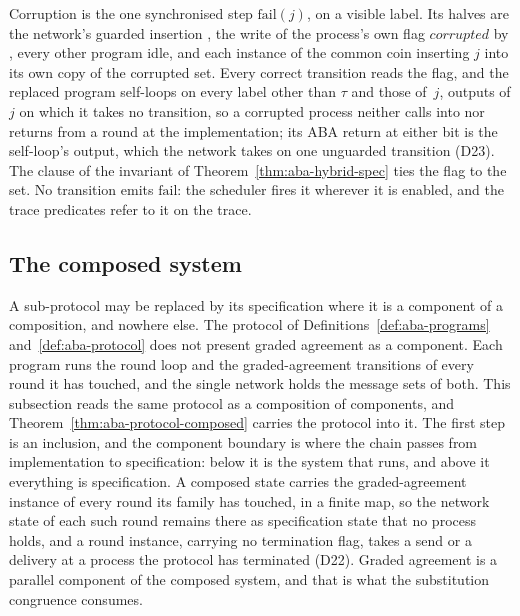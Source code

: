 Corruption is the one synchronised step $\mathrm{fail}(j)$, on a visible label.
Its halves are the network's guarded insertion , the write of the process's own flag $corrupted$ by , every other program idle, and each instance of the common coin inserting $j$ into its own copy of the corrupted set.
Every correct transition reads the flag, and the replaced program  self-loops on every label other than $\tau$ and those of \,$j$, outputs of $j$ on which it takes no transition, so a corrupted process neither calls into nor returns from a round at the implementation; its ABA return at either bit is the self-loop's output, which the network takes on one unguarded transition (D23).
The clause  of the invariant of Theorem~\ref{thm:aba-hybrid-spec} ties the flag to the set.
No transition emits $\mathrm{fail}$: the scheduler fires it wherever it is enabled, and the trace predicates refer to it on the trace.


\subsection{The composed system}

A sub-protocol may be replaced by its specification where it is a component of a composition, and nowhere else.
The protocol of Definitions~\ref{def:aba-programs} and~\ref{def:aba-protocol} does not present graded agreement as a component.
Each program runs the round loop and the graded-agreement transitions of every round it has touched, and the single network holds the message sets of both.
This subsection reads the same protocol as a composition of components, and Theorem~\ref{thm:aba-protocol-composed} carries the protocol into it.
The first step is an inclusion, and the component boundary is where the chain passes from implementation to specification: below it is the system that runs, and above it everything is specification.
A composed state carries the graded-agreement instance of every round its family has touched, in a finite map, so the network state of each such round remains there as specification state that no process holds, and a round instance, carrying no termination flag, takes a send or a delivery at a process the protocol has terminated (D22).
Graded agreement is a parallel component of the composed system, and that is what the substitution congruence consumes.

